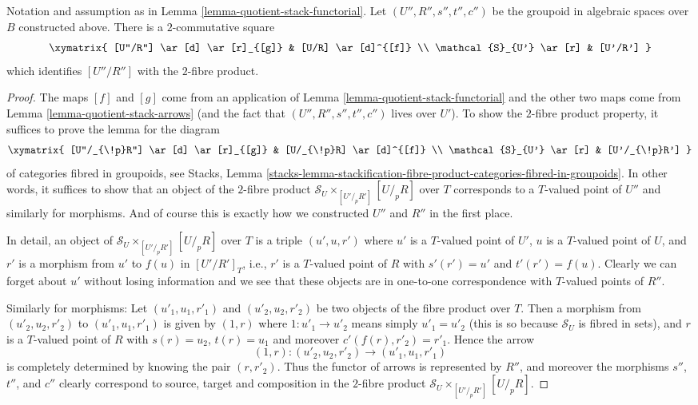 \begin{lemma}
\label{lemma-cartesian-square-of-morphism}
Notation and assumption as in
Lemma \ref{lemma-quotient-stack-functorial}.
Let $(U'', R'', s'', t'', c'')$ be the groupoid in algebraic spaces over $B$
constructed above.
There is a $2$-commutative square
$$
\xymatrix{
[U''/R''] \ar[d] \ar[r]_{[g]} & [U/R] \ar[d]^{[f]} \\
\mathcal{S}_{U'} \ar[r] & [U'/R']
}
$$
which identifies $[U''/R'']$ with the $2$-fibre product.
\end{lemma}

\begin{proof}
The maps $[f]$ and $[g]$ come from an application of
Lemma \ref{lemma-quotient-stack-functorial}
and the other two maps come from
Lemma \ref{lemma-quotient-stack-arrows}
(and the fact that $(U'', R'', s'', t'', c'')$ lives over $U'$).
To show the $2$-fibre product property, it suffices to prove the lemma
for the diagram
$$
\xymatrix{
[U''/_{\!p}R''] \ar[d] \ar[r]_{[g]} & [U/_{\!p}R] \ar[d]^{[f]} \\
\mathcal{S}_{U'} \ar[r] & [U'/_{\!p}R']
}
$$
of categories fibred in groupoids, see
Stacks, Lemma
\ref{stacks-lemma-stackification-fibre-product-categories-fibred-in-groupoids}.
In other words, it suffices to show that an object of the $2$-fibre product
$\mathcal{S}_U \times_{[U'/_{\!p}R']} [U/_{\!p}R]$ over $T$ corresponds
to a $T$-valued point of $U''$ and similarly for morphisms. And of course
this is exactly how we constructed $U''$ and $R''$ in the first place.

\medskip\noindent
In detail, an object of $\mathcal{S}_U \times_{[U'/_{\!p}R']} [U/_{\!p}R]$
over $T$ is a triple $(u', u, r')$ where $u'$ is a $T$-valued point of $U'$,
$u$ is a $T$-valued point of $U$, and $r'$ is a morphism from $u'$ to
$f(u)$ in $[U'/R']_T$, i.e., $r'$ is a $T$-valued point of $R$ with
$s'(r') = u'$ and $t'(r') = f(u)$. Clearly we can forget about $u'$
without losing information and we see that these objects are in one-to-one
correspondence with $T$-valued points of $R''$.

\medskip\noindent
Similarly for morphisms: Let $(u'_1, u_1, r'_1)$ and $(u'_2, u_2, r'_2)$ be
two objects of the fibre product over $T$. Then a morphism from
$(u'_2, u_2, r'_2)$ to $(u'_1, u_1, r'_1)$
is given by $(1, r)$ where $1 : u'_1 \to u'_2$ means simply $u'_1 = u'_2$
(this is so because $\mathcal{S}_U$ is fibred in sets), and $r$ is a
$T$-valued point of $R$ with $s(r) = u_2$, $t(r) = u_1$ and moreover
$c'(f(r), r'_2) = r'_1$. Hence the arrow
$$
(1, r) : (u'_2, u_2, r'_2) \to (u'_1, u_1, r'_1)
$$
is completely determined by knowing the pair $(r, r'_2)$. Thus the functor
of arrows is represented by $R''$, and moreover the morphisms $s''$, $t''$,
and $c''$ clearly correspond to source, target and composition in
the $2$-fibre product $\mathcal{S}_U \times_{[U'/_{\!p}R']} [U/_{\!p}R]$.
\end{proof}







